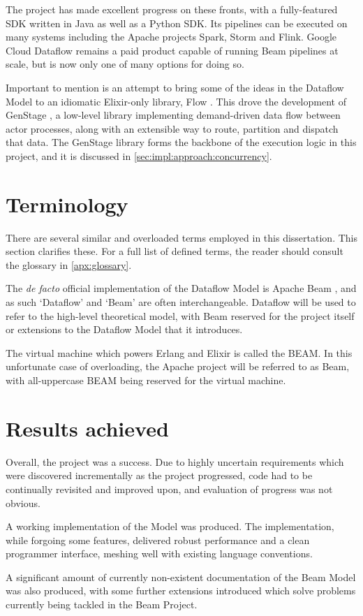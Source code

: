 The project has made excellent progress on these fronts, with a fully-featured SDK written in Java as well as a Python SDK.
Its pipelines can be executed on many systems including the Apache projects Spark, Storm and Flink.
Google Cloud Dataflow remains a paid product capable of running Beam pipelines at scale, but is now only one of many options for doing so.

Important to mention is an attempt to bring some of the ideas in the Dataflow Model to an idiomatic Elixir-only library, Flow \cite{ElixirFlow}.
This drove the development of GenStage \cite{ElixirGenStage}, a low-level library implementing demand-driven data flow between actor processes, along with an extensible way to route, partition and dispatch that data.
The GenStage library forms the backbone of the execution logic in this project, and it is discussed in \cref{sec:impl:approach:concurrency}.

\section{Terminology}\label{sec:intro:terminology}

There are several similar and overloaded terms employed in this dissertation.
This section clarifies these.
For a full list of defined terms, the reader should consult the glossary in \cref{apx:glossary}.

The \emph{de facto} official implementation of the Dataflow Model \cite{Akidau:2015} is Apache Beam \cite{ApacheBeam}, and as such `Dataflow' and `Beam' are often interchangeable.
Dataflow will be used to refer to the high-level theoretical model, with Beam reserved for the project itself or extensions to the Dataflow Model that it introduces.

The virtual machine which powers Erlang and Elixir is called the BEAM.
In this unfortunate case of overloading, the Apache project will be referred to as Beam, with all-uppercase BEAM being reserved for the virtual machine.

\section{Results achieved}\label{sec:intro:results}

Overall, the project was a success.
Due to highly uncertain requirements which were discovered incrementally as the project progressed, code had to be continually revisited and improved upon, and evaluation of progress was not obvious.

A working implementation of the Model was produced.
The implementation, while forgoing some features, delivered robust performance and a clean programmer interface, meshing well with existing language conventions.

A significant amount of currently non-existent documentation of the Beam Model was also produced, with some further extensions introduced which solve problems currently being tackled in the Beam Project.

